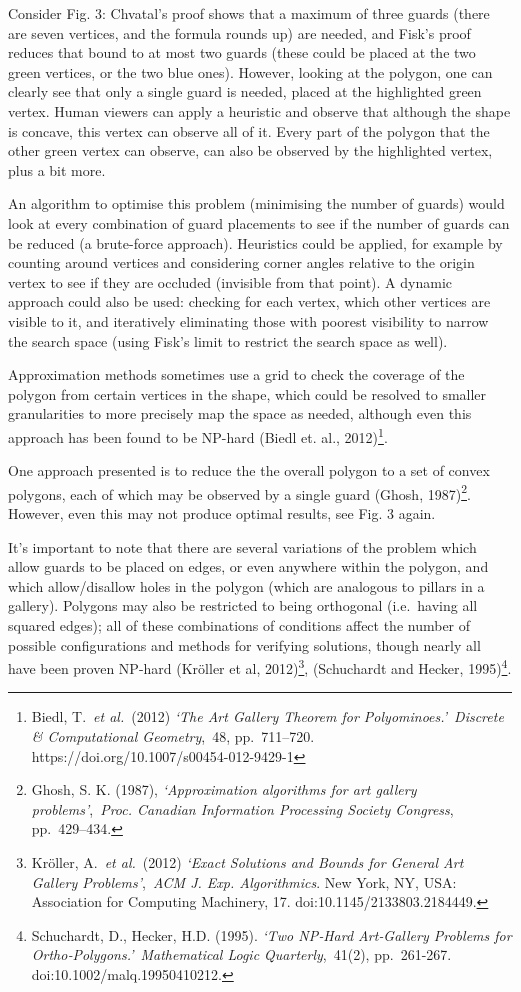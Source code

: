 \documentclass[
]{article}
\begin{document}
Consider Fig. 3: Chvatal's proof shows that a maximum of three guards
(there are seven vertices, and the formula rounds up) are needed, and
Fisk's proof reduces that bound to at most two guards (these could be
placed at the two green vertices, or the two blue ones). However,
looking at the polygon, one can clearly see that only a single guard is
needed, placed at the highlighted green vertex. Human viewers can apply
a heuristic and observe that although the shape is concave, this vertex
can observe all of it. Every part of the polygon that the other green
vertex can observe, can also be observed by the highlighted vertex, plus
a bit more.

An algorithm to optimise this problem (minimising the number of guards)
would look at every combination of guard placements to see if the number
of guards can be reduced (a brute-force approach). Heuristics could be
applied, for example by counting around vertices and considering corner
angles relative to the origin vertex to see if they are occluded
(invisible from that point). A dynamic approach could also be used:
checking for each vertex, which other vertices are visible to it, and
iteratively eliminating those with poorest visibility to narrow the
search space (using Fisk's limit to restrict the search space as well).

Approximation methods sometimes use a grid to check the coverage of the
polygon from certain vertices in the shape, which could be resolved to
smaller granularities to more precisely map the space as needed,
although even this approach has been found to be NP-hard (Biedl et. al.,
2012)\footnote{Biedl, T.~\emph{et al.}~(2012) \emph{`The Art Gallery
  Theorem for Polyominoes.'}~\emph{Discrete \& Computational
  Geometry},~48, pp.~711--720. https://doi.org/10.1007/s00454-012-9429-1}.

One approach presented is to reduce the the overall polygon to a set of
convex polygons, each of which may be observed by a single guard (Ghosh,
1987)\footnote{Ghosh, S. K. (1987), \emph{`Approximation algorithms for
  art gallery problems'},~\emph{Proc. Canadian Information Processing
  Society Congress}, pp.~429--434.}. However, even this may not produce
optimal results, see Fig. 3 again.

It's important to note that there are several variations of the problem
which allow guards to be placed on edges, or even anywhere within the
polygon, and which allow/disallow holes in the polygon (which are
analogous to pillars in a gallery). Polygons may also be restricted to
being orthogonal (i.e.~having all squared edges); all of these
combinations of conditions affect the number of possible configurations
and methods for verifying solutions, though nearly all have been proven
NP-hard (Kröller et al, 2012)\footnote{Kröller, A.~\emph{et al.}~(2012)
  \emph{`Exact Solutions and Bounds for General Art Gallery
  Problems'},~\emph{ACM J. Exp. Algorithmics}. New York, NY, USA:
  Association for Computing Machinery, 17. doi:10.1145/2133803.2184449.},
(Schuchardt and Hecker, 1995)\footnote{Schuchardt, D., Hecker, H.D.
  (1995). \emph{`Two NP‐Hard Art‐Gallery Problems for
  Ortho‐Polygons.'}~\emph{Mathematical Logic Quarterly},~41(2),
  pp.~261-267. doi:10.1002/malq.19950410212.}.
\end{document}
